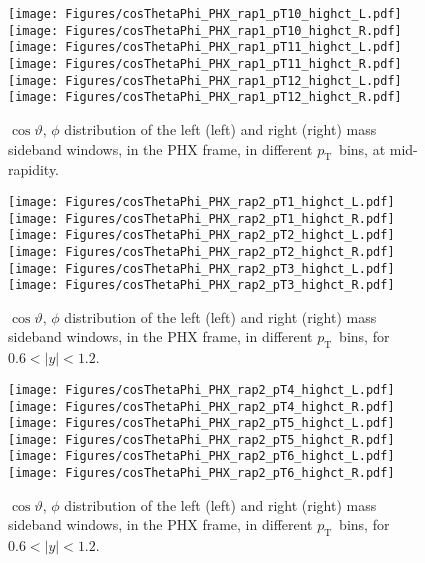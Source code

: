 \documentclass[12pt]{article}
\newcommand{\pt}{$p_{\mathrm{T}}$}
\begin{document}
\begin{figure}[htbp]
\centering
\texttt{[image: Figures/cosThetaPhi\_PHX\_rap1\_pT10\_highct\_L.pdf]}
\texttt{[image: Figures/cosThetaPhi\_PHX\_rap1\_pT10\_highct\_R.pdf]}
\texttt{[image: Figures/cosThetaPhi\_PHX\_rap1\_pT11\_highct\_L.pdf]}
\texttt{[image: Figures/cosThetaPhi\_PHX\_rap1\_pT11\_highct\_R.pdf]}
\texttt{[image: Figures/cosThetaPhi\_PHX\_rap1\_pT12\_highct\_L.pdf]}
\texttt{[image: Figures/cosThetaPhi\_PHX\_rap1\_pT12\_highct\_R.pdf]}
\caption{$\cos\vartheta,\,\phi$ distribution of the left (left) and
  right (right) mass sideband windows, in the PHX frame, in different
  \pt\ bins, at mid-rapidity.} 
\end{figure}
\clearpage

\begin{figure}[htbp]
\centering
\texttt{[image: Figures/cosThetaPhi\_PHX\_rap2\_pT1\_highct\_L.pdf]}
\texttt{[image: Figures/cosThetaPhi\_PHX\_rap2\_pT1\_highct\_R.pdf]}
\texttt{[image: Figures/cosThetaPhi\_PHX\_rap2\_pT2\_highct\_L.pdf]}
\texttt{[image: Figures/cosThetaPhi\_PHX\_rap2\_pT2\_highct\_R.pdf]}
\texttt{[image: Figures/cosThetaPhi\_PHX\_rap2\_pT3\_highct\_L.pdf]}
\texttt{[image: Figures/cosThetaPhi\_PHX\_rap2\_pT3\_highct\_R.pdf]}
\caption{$\cos\vartheta,\,\phi$ distribution of the left (left) and
  right (right) mass sideband windows, in the PHX frame, in different
  \pt\ bins, for $0.6 < |y| < 1.2$.}
\end{figure}
\clearpage

\begin{figure}[htbp]
\centering
\texttt{[image: Figures/cosThetaPhi\_PHX\_rap2\_pT4\_highct\_L.pdf]}
\texttt{[image: Figures/cosThetaPhi\_PHX\_rap2\_pT4\_highct\_R.pdf]}
\texttt{[image: Figures/cosThetaPhi\_PHX\_rap2\_pT5\_highct\_L.pdf]}
\texttt{[image: Figures/cosThetaPhi\_PHX\_rap2\_pT5\_highct\_R.pdf]}
\texttt{[image: Figures/cosThetaPhi\_PHX\_rap2\_pT6\_highct\_L.pdf]}
\texttt{[image: Figures/cosThetaPhi\_PHX\_rap2\_pT6\_highct\_R.pdf]}
\caption{$\cos\vartheta,\,\phi$ distribution of the left (left) and
  right (right) mass sideband windows, in the PHX frame, in different
  \pt\ bins, for $0.6 < |y| < 1.2$.} 
\end{figure}
\clearpage
\end{document}
